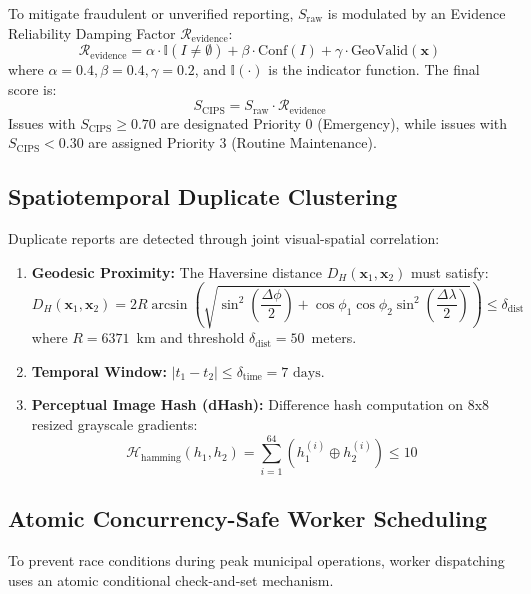 \documentclass[conference]{IEEEtran}
\begin{document}
To mitigate fraudulent or unverified reporting, $S_{\text{raw}}$ is modulated by an Evidence Reliability Damping Factor $\mathcal{R}_{\text{evidence}}$:
\begin{equation}
    \mathcal{R}_{\text{evidence}} = \alpha \cdot \mathbb{I}(I \neq \emptyset) + \beta \cdot \text{Conf}(I) + \gamma \cdot \text{GeoValid}(\mathbf{x})
\end{equation}
where $\alpha=0.4, \beta=0.4, \gamma=0.2$, and $\mathbb{I}(\cdot)$ is the indicator function. The final score is:
\begin{equation}
    S_{\text{CIPS}} = S_{\text{raw}} \cdot \mathcal{R}_{\text{evidence}}
    \label{eq:cips}
\end{equation}
Issues with $S_{\text{CIPS}} \ge 0.70$ are designated Priority 0 (Emergency), while issues with $S_{\text{CIPS}} < 0.30$ are assigned Priority 3 (Routine Maintenance).

\subsection{Spatiotemporal Duplicate Clustering}
Duplicate reports are detected through joint visual-spatial correlation:
\begin{enumerate}
    \item \textbf{Geodesic Proximity:} The Haversine distance $D_H(\mathbf{x}_1, \mathbf{x}_2)$ must satisfy:
    \begin{equation}
        D_H(\mathbf{x}_1, \mathbf{x}_2) = 2 R \arcsin\left(\sqrt{\sin^2\left(\frac{\Delta \phi}{2}\right) + \cos\phi_1\cos\phi_2\sin^2\left(\frac{\Delta \lambda}{2}\right)}\right) \le \delta_{\text{dist}}
    \end{equation}
    where $R = 6371$~km and threshold $\delta_{\text{dist}} = 50$~meters.
    \item \textbf{Temporal Window:} $|t_1 - t_2| \le \delta_{\text{time}} = 7\text{ days}$.
    \item \textbf{Perceptual Image Hash (dHash):} Difference hash computation on 8x8 resized grayscale gradients:
    \begin{equation}
        \mathcal{H}_{\text{hamming}}(h_1, h_2) = \sum_{i=1}^{64} (h_1^{(i)} \oplus h_2^{(i)}) \le 10
    \end{equation}
\end{enumerate}

\subsection{Atomic Concurrency-Safe Worker Scheduling}
To prevent race conditions during peak municipal operations, worker dispatching uses an atomic conditional check-and-set mechanism.
\end{document}
